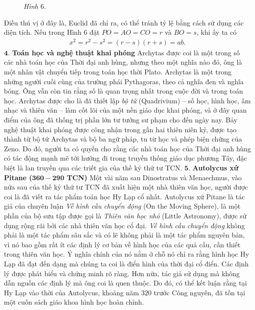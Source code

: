 \begin{multicols}{2}
\begin{figure}[H]
		\caption{\small\textit{\color{lichsutoanhoc}Hình $6$.}}
		\vspace*{-10pt}
	\end{figure}
	Điều thú vị ở đây là, Euclid đã chỉ ra, có thể tránh tỷ lệ bằng cách sử dụng các diện tích.
	\vskip 0.1cm
	Nếu trong Hình $6$ đặt $PO = AO = CO =r$  và $BO = s$,  khi ấy ta có 
	\begin{align*}
		x^2 = r^2 - s^2 = (r-s)(r+s) = ab.
	\end{align*}
	$\pmb{4.}$ \textbf{\color{lichsutoanhoc}Toán học và nghệ thuật khai phóng} 
	\vskip 0.1cm
	Archytas được coi là một trong số các nhà toán học của Thời đại anh hùng, nhưng theo một nghĩa nào đó, ông là một nhân vật chuyển tiếp trong toán học thời Plato. 
	\vskip 0.1cm
	Archytas là một trong những người cuối cùng của trường phái Pythagoras, theo cả nghĩa đen và nghĩa bóng. Ông vẫn còn tin rằng số là quan trọng nhất trong cuộc đời và trong toán học.
	\vskip 0.1cm 
	Archytas được cho là đã thiết lập \textit{bộ tứ} (Quadrivium) -- số học, hình học, âm nhạc và thiên văn -- làm cốt lõi của một nền giáo dục khai phóng, và ở đây quan điểm của ông đã thống trị phần lớn tư tưởng sư phạm cho đến ngày nay.
	\vskip 0.1cm
	Bảy nghệ thuật khai phóng được công nhận trong gần hai thiên niên kỷ, được tạo thành từ bộ tứ Archytas và bộ ba ngữ pháp, tu từ học và phép biện chứng của Zeno. Do đó, người ta có quyền cho rằng các nhà toán học của Thời đại anh hùng có tác động mạnh mẽ tới hướng đi trong truyền thống giáo dục phương Tây, đặc biệt là lan truyền qua các triết gia của thế kỷ thứ tư TCN.
	\vskip 0.1cm
	$\pmb{5.}$ \textbf{\color{lichsutoanhoc}Autolycus xứ Pitane ($\pmb{360-290}$ TCN)}
	\vskip 0.1cm
	Một vài năm sau Dinostratus và Menaechmus, vào nửa sau của thế kỷ thứ tư TCN đã xuất hiện một nhà thiên văn học, người được coi là đã viết ra tác phẩm toán học Hy Lạp cổ nhất. 
	\vskip 0.1cm
	Autolycus xứ Pitane là tác giả của chuyên luận \textit{Về hình cầu chuyển động} (On the Moving Sphere), là một phần của bộ sưu tập được gọi là \textit{Thiên văn học nhỏ} (Little Astronomy), được sử dụng rộng rãi bởi các nhà thiên văn học cổ đại. \textit{Về hình cầu chuyển động} không phải là một tác phẩm sâu sắc và có lẽ không phải là một tác phẩm nguyên bản, vì nó bao gồm rất ít các định lý cơ bản về hình học của các quả cầu, cần thiết trong thiên văn học. Ý nghĩa chính của nó nằm ở chỗ nó chỉ ra rằng hình học Hy Lạp đã đạt đến dạng mà chúng ta coi là điển hình của thời đại cổ điển. Các định lý được phát biểu và chứng minh rõ ràng. Hơn nữa, tác giả sử dụng mà không  dẫn nguồn các định lý mà ông coi là quen thuộc. Do đó, có thể kết luận rằng tại Hy Lạp vào thời của Autolycus, khoảng năm $320$ trước Công nguyên, đã tồn tại một cuốn sách giáo khoa hình học hoàn chỉnh. 

\end{multicols}
